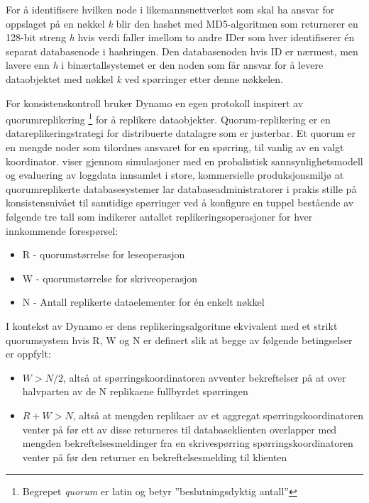 For å identifisere hvilken node i likemannsnettverket som skal ha ansvar for oppslaget på en nøkkel \emph{k} blir den hashet med MD5-algoritmen som returnerer en 128-bit streng \emph{h} hvis verdi faller imellom to andre IDer som hver identifiserer én separat databasenode i hashringen. Den databasenoden hvis ID er nærmest, men lavere enn \emph{h} i binærtallsystemet er den noden som får ansvar for å levere dataobjektet med nøkkel \emph{k} ved spørringer etter denne nøkkelen.

For konsistenskontroll bruker Dynamo en egen protokoll inspirert av quorumreplikering \footnote{Begrepet \emph{quorum} er latin og betyr ''beslutningsdyktig antall''} for å replikere dataobjekter. Quorum-replikering er en datareplikeringstrategi for distribuerte datalagre som er justerbar. Et quorum er en mengde noder som tilordnes ansvaret for en spørring, til vanlig av en valgt koordinator. \cite{bailis2014} viser gjennom simulasjoner med en probalistisk sannsynlighetsmodell og evaluering av loggdata innsamlet i store, kommersielle produksjonsmiljø at quorumreplikerte databasesystemer lar databaseadministratorer i prakis stille på konsistensnivået til samtidige spørringer ved å konfigure en tuppel bestående av følgende tre tall som indikerer antallet replikeringsoperasjoner for hver innkommende forespørsel:

\begin{itemize}
  \item R - quorumstørrelse for leseoperasjon
  \item W - quorumstørrelse for skriveoperasjon
  \item N - Antall replikerte dataelementer for én enkelt nøkkel
\end{itemize}

I kontekst av Dynamo er dens replikeringsalgoritme ekvivalent med et strikt quorumsystem hvis R, W og N er definert slik at begge av følgende betingselser er oppfylt:

\begin{itemize}
  \item \(W > N/2\), altså at spørringskoordinatoren avventer bekreftelser på at over halvparten av de N replikaene fullbyrdet spørringen
  \item \(R + W > N\), altså at mengden replikaer av et aggregat spørringskoordinatoren venter på før ett av disse returneres til databaseklienten overlapper med mengden bekreftelsesmeldinger fra en skrivespørring spørringskoordinatoren venter på før den returner en bekreftelsesmelding til klienten
\end{itemize}


